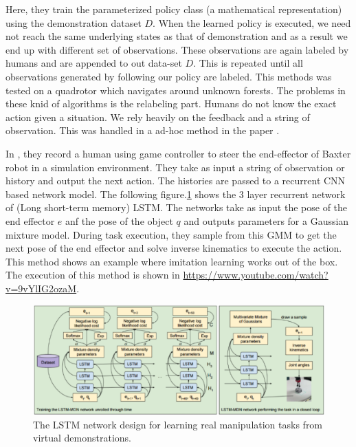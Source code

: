 \documentclass[11pt]{article}
\begin{document}
Here, they train the parameterized policy class (a mathematical representation) using the demonstration dataset $D$. When the learned policy is executed, we need not reach the same underlying states as that of demonstration and as a result we end up with different set of observations. These observations are again labeled by humans and are appended to out data-set $D$. This is repeated until all observations generated by following our policy are labeled. This methods was tested on a quadrotor which navigates around unknown forests. The problems in these knid of algorithms is the relabeling part. Humans do not know the exact action given a situation. We rely heavily on the feedback and a string of observation. This was handled in a ad-hoc method in the paper \cite{dagger}. 

In \cite{lstm}, they record a human using game controller to steer the end-effector of Baxter robot in a simulation environment. They take as input a string of observation or history and output the next action. The histories are passed to a recurrent CNN based network model. The following figure.\ref{fig:lstm} shows the 3 layer recurrent network of (Long short-term memory) LSTM\cite{lstmbirth}. The networks take as input the pose of the end effector $e$ anf the pose of the object $q$ and outputs parameters for a Gaussian mixture model. During task execution, they sample from this GMM to get the next pose of the end effector and solve inverse kinematics to execute the action. This method shows an example where imitation learning works out of the box. The execution of this method is shown in \url{https://www.youtube.com/watch?v=9vYlIG2ozaM}. 

\begin{figure}[H]
  \begin{center}
    \includegraphics[width=\linewidth]{images/lstm.png}
    \caption{The LSTM network design for learning real manipulation tasks from virtual demonstrations.}
    \label{fig:lstm}
  \end{center}
\end{figure}
\end{document}
